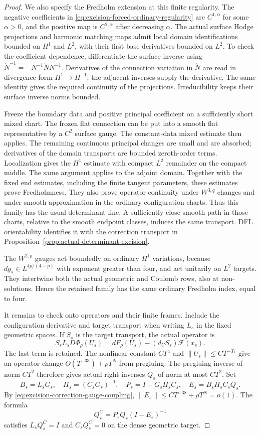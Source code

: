 \documentclass[11pt]{amsart}
\theoremstyle{definition}
\theoremstyle{remark}
\theoremstyle{plain}
\begin{document}
\begin{proof}
We also specify the Fredholm extension at this finite
regularity. The negative coefficients in
\eqref{eq:excision-forced-ordinary-regularity} are
$C^{1,\alpha}$ for some $\alpha>0$, and the positive
map is $C^{2,\alpha}$ after decreasing $\alpha$.
The actual surface Hodge projections and harmonic matching
maps admit local domain identifications bounded on $H^1$
and $L^2$, with their first base derivatives bounded on
$L^2$. To check the coefficient dependence, differentiate
the surface inverse using
$\dot N^{-1}=-N^{-1}\dot N N^{-1}$.
Derivatives of the connection variation in $\dot N$ are
read in divergence form $H^1\to H^{-1}$; the adjacent
inverses supply the derivative. The same identity gives
the required continuity of the projections.
Irreducibility keeps their surface inverse norms bounded.

Freeze the boundary data and positive principal
coefficient on a sufficiently short mixed chart.
The frozen flat connection can be put into a smooth
flat representative by a $C^2$ surface gauge.
The constant-data mixed estimate then applies.
The remaining continuous principal changes are small
and are absorbed; derivatives of the domain transports
are bounded zeroth-order terms. Localization gives the
$H^1$ estimate with compact $L^2$ remainder on the
compact middle. The same argument applies to the
adjoint domain. Together with the fixed end estimates,
including the finite tangent parameters, these estimates
prove Fredholmness. They also prove operator continuity
under $W^{3,q}$ changes and under smooth approximation
in the ordinary configuration charts.
Thus this family has the usual determinant line.
A sufficiently close smooth path in those charts, relative
to the smooth endpoint classes, induces the same transport.
DFL orientability identifies it with the correction
transport in Proposition~\ref{prop:actual-determinant-excision}.

The $W^{2,p}$ gauges act boundedly on ordinary $H^1$
variations, because $dg_s\in L^{4p/(4-p)}$ with exponent
greater than four, and act unitarily on $L^2$ targets.
They intertwine both the actual geometric and Coulomb
rows, also at non-solutions. Hence the retained family
has the same ordinary Fredholm index, equal to four.

It remains to check onto operators and their finite frames.
Include the configuration derivative and target transport
when writing $L_s$ in the fixed geometric spaces.
If $S_s$ is the target transport, the actual operator is
\[
 S_sL_sD\Phi_\rho(U_s)
     =dF_\rho(U_s)-(d_US_s)\mathcal F(x_s).
\]
The last term is retained. The nonlinear constant $CT^4$
and $\|U_s\|\leq CT^{-37}$ give an operator change
$O(T^{-33})+\rho T^N$ from pregluing.
The pregluing inverse of norm $CT^2$ therefore gives
actual right inverses $Q_s$ of norm at most $CT^2$.
Set
\[
 B_s=L_sG_s,\quad H_s=(C_sG_s)^{-1},\quad
 P_s=I-G_sH_sC_s,\quad E_s=B_sH_sC_sQ_s .
\]
By \eqref{eq:excision-correction-gauge-coupling},
$\|E_s\|\leq CT^{-38}+\rho T^N=o(1)$.
The formula
\[
                        Q_s^C=P_sQ_s(I-E_s)^{-1}
\]
satisfies $L_sQ_s^C=I$ and $C_sQ_s^C=0$ on the dense
geometric target.


\end{proof}
\end{document}

